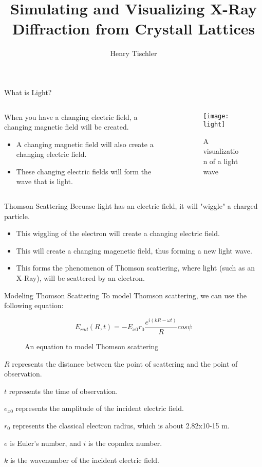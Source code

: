 \documentclass[aspectratio=169]{beamer}
\title {Simulating and Visualizing X-Ray Diffraction from Crystall Lattices}
\author{Henry Tischler}
\institute[Institute of Computing in Research]
\begin{document}
	\titlepage


\begin {frame}{What is Light?}
	\begin{columns}
	
	\begin{column}[b]{.5\textwidth}
	When you have a changing electric field, a changing magnetic field will be created.
		\begin{itemize}
		\item A changing magnetic field will also create a changing electric field.
		\item These changing electric fields will form the wave that is light.
		\end{itemize}		
	\end{column}\
	
\begin{column}{.5\textwidth}
		\begin{figure}
			\texttt{[image: light]}
			\caption{A visualization of a light wave}
		\end{figure}
	\end{column}
	
	\end{columns}
\end{frame}

\begin{frame}[t]{Thomson Scattering}
	Becuase light has an electric field, it will "wiggle" a charged particle.
	
	\begin{itemize}
		\item This wiggling of the electron will create a changing electric field.
		\item This will create a changing magenetic field, thus forming a new light wave. 
		\item This forms the phenomenon of Thomson scattering, where light (such as an X-Ray), will be scattered by an electron.
	\end{itemize}
	
\end{frame}

\begin{frame}[t]{Modeling Thomson Scattering}
	To model Thomson scattering, we can use the following equation:
	
	\begin{figure}
		$$ E_{rad}(R, t) = -E_{x0} {r_0} \frac{e^{i(kR-\omega t)}}{R} cos \psi$$
		\caption{An equation to model Thomson scattering}
	\end{figure}
	
		{$R$ represents the distance between the point of scattering and the point of observation.

$t$ represents the time of observation.

$e_{x0}$ represents the amplitude of the incident electric field.

$r_0$ represents the classical electron radius, which is about 2.82x10-15 m.

$e$ is Euler's number, and $i$ is the copmlex number.

$k$ is the wavenumber of the incident electric field.}

\end{frame}
	
\end{document}
